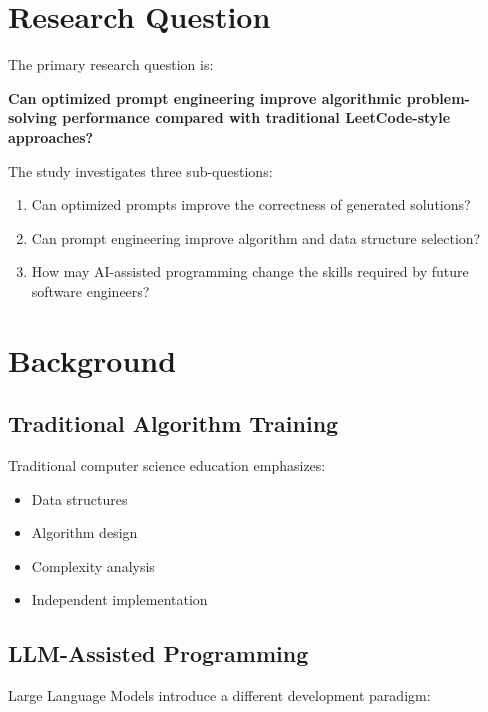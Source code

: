 \documentclass[11pt,a4paper]{article}
\begin{document}
\section{Research Question}

The primary research question is:

\textbf{
Can optimized prompt engineering improve algorithmic problem-solving
performance compared with traditional LeetCode-style approaches?
}

The study investigates three sub-questions:

\begin{enumerate}

\item
Can optimized prompts improve the correctness of generated solutions?

\item
Can prompt engineering improve algorithm and data structure selection?

\item
How may AI-assisted programming change the skills required by future
software engineers?

\end{enumerate}





\section{Background}

\subsection{Traditional Algorithm Training}

Traditional computer science education emphasizes:

\begin{itemize}
\item Data structures
\item Algorithm design
\item Complexity analysis
\item Independent implementation
\end{itemize}


\subsection{LLM-Assisted Programming}

Large Language Models introduce a different development paradigm:
\end{document}
